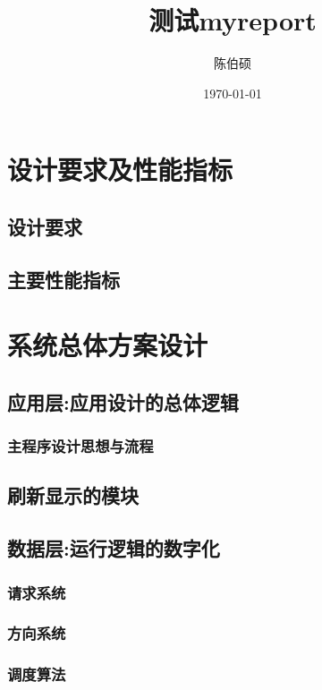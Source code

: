 \documentclass[pdfCover]{myreport} %
\title{测试myreport}
\author{陈伯硕}
\date{\today}
\begin{document}
\maketitle

\tableofcontents
\newpage

\section{设计要求及性能指标}
  \subsection{设计要求}
    
  \subsection{主要性能指标}
    

\newpage
\section{系统总体方案设计}
  \subsection{应用层:应用设计的总体逻辑}
    \subsubsection{主程序设计思想与流程}
      
    \subsection{刷新显示的模块}

  \subsection{数据层:运行逻辑的数字化}
    \subsubsection{请求系统}
      
    \subsubsection{方向系统}
      
    \subsubsection{调度算法}
\end{document}
